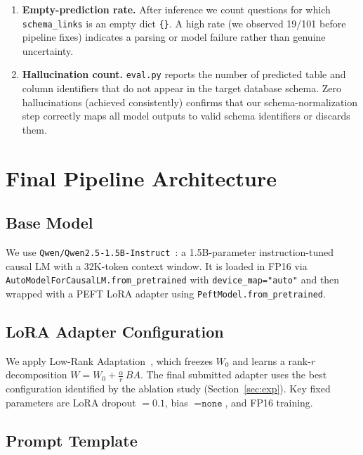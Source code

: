 \documentclass[11pt,letterpaper]{article}
\begin{document}
\begin{enumerate}[leftmargin=*,noitemsep]
  \item \textbf{Empty-prediction rate.}
        After inference we count questions for which \texttt{schema\_links}
        is an empty dict \texttt{\{\}}.
        A high rate (we observed 19/101 before pipeline fixes) indicates a
        parsing or model failure rather than genuine uncertainty.
  \item \textbf{Hallucination count.}
        \texttt{eval.py} reports the number of predicted table and column
        identifiers that do not appear in the target database schema.
        Zero hallucinations (achieved consistently) confirms that our
        schema-normalization step correctly maps all model outputs to valid
        schema identifiers or discards them.
\end{enumerate}

\section{Final Pipeline Architecture}
\label{sec:pipeline}

\subsection{Base Model}

We use \texttt{Qwen/Qwen2.5-1.5B-Instruct}~\cite{qwen25}: a 1.5B-parameter
instruction-tuned causal LM with a 32K-token context window.
It is loaded in FP16 via \texttt{AutoModelForCausalLM.from\_pretrained} with
\texttt{device\_map="auto"} and then wrapped with a PEFT LoRA adapter using
\texttt{PeftModel.from\_pretrained}.

\subsection{LoRA Adapter Configuration}

We apply Low-Rank Adaptation~\cite{lora}, which freezes $W_0$ and learns a
rank-$r$ decomposition $W = W_0 + \tfrac{\alpha}{r}\,BA$.
The final submitted adapter uses the best configuration identified by the
ablation study (Section~\ref{sec:exp}).
Key fixed parameters are LoRA dropout $= 0.1$, bias $= \texttt{none}$, and
FP16 training.

\subsection{Prompt Template}
\end{document}
